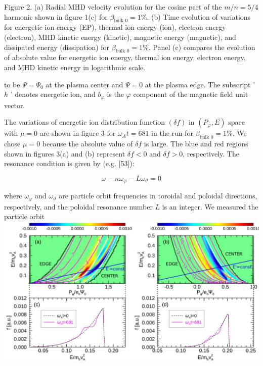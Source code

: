\documentclass[10pt]{article}
\begin{document}
Figure 2. (a) Radial MHD velocity evolution for the cosine part of the $m / n=5 / 4$ harmonic shown in figure 1(c) for $\beta_{\text {bulk } 0}=1 \%$. (b) Time evolution of variations for energetic ion energy (EP), thermal ion energy (ion), electron energy (electron), MHD kinetic energy (kinetic), magnetic energy (magnetic), and dissipated energy (dissipation) for $\beta_{\text {bulk } 0}=1 \%$. Panel (c) compares the evolution of absolute value for energetic ion energy, thermal ion energy, electron energy, and MHD kinetic energy in logarithmic scale.

to be $\Psi=\Psi_{0}$ at the plasma center and $\Psi=0$ at the plasma edge. The subscript ' $h$ ' denotes energetic ion, and $b_{\varphi}$ is the $\varphi$ component of the magnetic field unit vector.

The variations of energetic ion distribution function $(\delta f)$ in $\left(P_{\varphi}, E\right)$ space with $\mu=0$ are shown in figure 3 for $\omega_{A} t=681$ in the run for $\beta_{\text {bulk } 0}=1 \%$. We chose $\mu=0$ because the absolute value of $\delta f$ is large. The blue and red regions shown in figures 3(a) and (b) represent $\delta f<0$ and $\delta f>0$, respectively. The resonance condition is given by (e.g. [53]):

$$
\omega-n \omega_{\varphi}-L \omega_{\vartheta}=0
$$

where $\omega_{\varphi}$ and $\omega_{\vartheta}$ are particle orbit frequencies in toroidal and poloidal directions, respectively, and the poloidal resonance number $L$ is an integer. We measured the particle orbit
\includegraphics[max width=\textwidth, center]{2023_06_04_de2f4b8aa3fd859f006dg-07}
\end{document}
